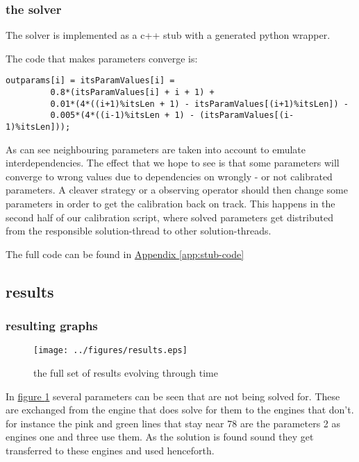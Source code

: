 \documentclass[]{lofar}
\begin{document}
      \subsubsection{the solver}
      \label{subsubsec:solver}
        The solver is implemented as a c++ stub with a generated
        python wrapper.

        The code that makes parameters converge is:

\begin{Verbatim}[]
      outparams[i] = itsParamValues[i] =
         0.8*(itsParamValues[i] + i + 1) +
         0.01*(4*((i+1)%itsLen + 1) - itsParamValues[(i+1)%itsLen]) -
         0.005*(4*((i-1)%itsLen + 1) - (itsParamValues[(i-1)%itsLen]));
\end{Verbatim}

        As can see neighbouring parameters are taken into account to
        emulate interdependencies. The effect that we hope to see is
        that some parameters will converge to wrong values due to
        dependencies on wrongly - or not calibrated parameters. A
        cleaver strategy or a observing operator should then change
        some parameters in order to get the calibration back on
        track. This happens in the second half of our calibration
        script, where solved parameters get distributed from the
        responsible solution-thread to other solution-threads.

        The full code can be found in \hyperlink{stub-code}{Appendix
        {\ref*{app:stub-code}}}

    \subsection{results}
    \label{subsec:results}

      \subsubsection{resulting graphs}
      \label{subsubsec:resulting-graphs}

      \begin{figure}
        \texttt{[image: ../figures/results.eps]}
        \hypertarget{fig:results}{}
        \caption{the full set of results evolving through time\label{fig:results}}
      \end{figure}

      In \hyperlink{fig:results}{figure \ref{fig:results}} several parameters
      can be seen that are not being solved for. These are exchanged
      from the engine that does solve for them to the engines that
      don't. for instance the pink and green lines that stay near 78
      are the parameters 2 as engines one and three use them. As the
      solution is found sound they get transferred to these engines
      and used henceforth.
\end{document}
